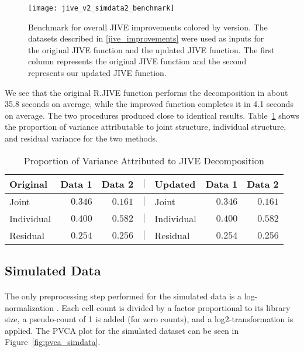 \documentclass[
12pt, %
letterpaper, %
oneside, %
headinclude,footinclude, %
BCOR5mm, %
]{scrartcl}
\begin{document}
\begin{figure}[ht]
    \centering 
    \texttt{[image: jive\_v2\_simdata2\_benchmark]} 
    \caption[Benchmark for JIVE Improvements]{Benchmark for overall JIVE improvements colored by version. The datasets described in \ref{jive_improvements} were used as inputs for the original JIVE function and the updated JIVE function. The first column represents the original JIVE function and the second represents our updated JIVE function.}
    \label{fig:jive_v2_simdata2_benchmark} 
\end{figure}

We see that the original R.JIVE function performs the decomposition in about 35.8 seconds on average, while the improved function completes it in 4.1 seconds on average. The two procedures produced close to identical results. Table~\ref{tab:simdata2_variance} shows the proportion of variance attributable to joint structure, individual structure, and residual variance for the two methods.

\begin{table}[ht]
    \caption{Proportion of Variance Attributed to JIVE Decomposition}
    \centering
    \begin{tabular}{lrrclrr}
        \toprule
        Original   & Data 1  & Data 2  & $\mid$ & Updated    & Data 1  & Data 2  \\
        \midrule
        Joint      & $0.346$ & $0.161$ & $\mid$ & Joint      & $0.346$ & $0.161$ \\
        Individual & $0.400$ & $0.582$ & $\mid$ & Individual & $0.400$ & $0.582$ \\
        Residual   & $0.254$ & $0.256$ & $\mid$ & Residual   & $0.254$ & $0.256$ \\
        \bottomrule
        \end{tabular}
    \label{tab:simdata2_variance}
\end{table}


\subsection{Simulated Data}

\paragraph*{}
The only preprocessing step performed for the simulated data is a log-normalization \citep{davis2017scater}. Each cell count is divided by a factor proportional to its library size, a pseudo-count of 1 is added (for zero counts), and a log2-transformation is applied. The PVCA plot for the simulated dataset can be seen in Figure~\ref{fig:pvca_simdata}.
\end{document}

